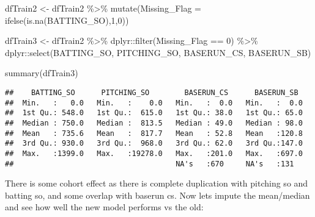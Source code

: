 \documentclass[
]{article}
\newenvironment{Shaded}{\begin{snugshade}}{\end{snugshade}}
\newcommand{\AttributeTok}[1]{\textcolor[rgb]{0.77,0.63,0.00}{#1}}
\newcommand{\DecValTok}[1]{\textcolor[rgb]{0.00,0.00,0.81}{#1}}
\newcommand{\FunctionTok}[1]{\textcolor[rgb]{0.00,0.00,0.00}{#1}}
\newcommand{\NormalTok}[1]{#1}
\newcommand{\OtherTok}[1]{\textcolor[rgb]{0.56,0.35,0.01}{#1}}
\newcommand{\SpecialCharTok}[1]{\textcolor[rgb]{0.00,0.00,0.00}{#1}}
\begin{document}
\begin{Shaded}
\begin{Highlighting}[]
\NormalTok{dfTrain2 }\OtherTok{\textless{}{-}}\NormalTok{ dfTrain2 }\SpecialCharTok{\%\textgreater{}\%}
  \FunctionTok{mutate}\NormalTok{(}\AttributeTok{Missing\_Flag =} \FunctionTok{ifelse}\NormalTok{(}\FunctionTok{is.na}\NormalTok{(BATTING\_SO),}\DecValTok{1}\NormalTok{,}\DecValTok{0}\NormalTok{))}

\NormalTok{dfTrain3 }\OtherTok{\textless{}{-}}\NormalTok{ dfTrain2 }\SpecialCharTok{\%\textgreater{}\%}
\NormalTok{  dplyr}\SpecialCharTok{::}\FunctionTok{filter}\NormalTok{(Missing\_Flag }\SpecialCharTok{==} \DecValTok{0}\NormalTok{) }\SpecialCharTok{\%\textgreater{}\%}
\NormalTok{  dplyr}\SpecialCharTok{::}\FunctionTok{select}\NormalTok{(BATTING\_SO, PITCHING\_SO, BASERUN\_CS, BASERUN\_SB) }
  

\FunctionTok{summary}\NormalTok{(dfTrain3)}
\end{Highlighting}
\end{Shaded}

\begin{verbatim}
##    BATTING_SO      PITCHING_SO        BASERUN_CS      BASERUN_SB   
##  Min.   :   0.0   Min.   :    0.0   Min.   :  0.0   Min.   :  0.0  
##  1st Qu.: 548.0   1st Qu.:  615.0   1st Qu.: 38.0   1st Qu.: 65.0  
##  Median : 750.0   Median :  813.5   Median : 49.0   Median : 98.0  
##  Mean   : 735.6   Mean   :  817.7   Mean   : 52.8   Mean   :120.8  
##  3rd Qu.: 930.0   3rd Qu.:  968.0   3rd Qu.: 62.0   3rd Qu.:147.0  
##  Max.   :1399.0   Max.   :19278.0   Max.   :201.0   Max.   :697.0  
##                                     NA's   :670     NA's   :131
\end{verbatim}

There is some cohort effect as there is complete duplication with
pitching so and batting so, and some overlap with baserun cs. Now lets
impute the mean/median and see how well the new model performs vs the
old:
\end{document}
